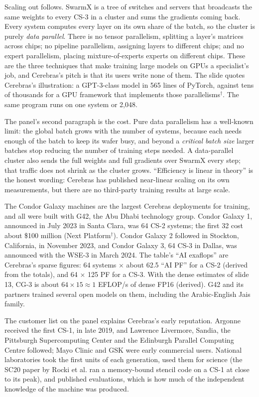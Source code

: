 \documentclass[11pt,letterpaper]{article}
\begin{document}
Scaling out follows. SwarmX is a tree of switches and servers that broadcasts the same weights to every CS-3 in a cluster and sums the gradients coming back. Every system computes every layer on its own share of the batch, so the cluster is purely \emph{data parallel}. There is no tensor parallelism, splitting a layer's matrices across chips; no pipeline parallelism, assigning layers to different chips; and no expert parallelism, placing mixture-of-experts experts on different chips. These are the three techniques that make training large models on GPUs a specialist's job, and Cerebras's pitch is that its users write none of them. The slide quotes Cerebras's illustration: a GPT-3-class model in 565 lines of PyTorch, against tens of thousands for a GPU framework that implements those parallelisms$^\dagger$. The same program runs on one system or 2{,}048.

The panel's second paragraph is the cost. Pure data parallelism has a well-known limit: the global batch grows with the number of systems, because each needs enough of the batch to keep its wafer busy, and beyond a \emph{critical batch size} larger batches stop reducing the number of training steps needed. A data-parallel cluster also sends the full weights and full gradients over SwarmX every step; that traffic does not shrink as the cluster grows. ``Efficiency is linear in theory'' is the honest wording: Cerebras has published near-linear scaling on its own measurements, but there are no third-party training results at large scale.

The Condor Galaxy machines are the largest Cerebras deployments for training, and all were built with G42, the Abu Dhabi technology group. Condor Galaxy 1, announced in July 2023 in Santa Clara, was 64 CS-2 systems; the first 32 cost about \$100 million (Next Platform$^\dagger$). Condor Galaxy 2 followed in Stockton, California, in November 2023, and Condor Galaxy 3, 64 CS-3 in Dallas, was announced with the WSE-3 in March 2024. The table's ``AI exaflops'' are Cerebras's sparse figures: 64 systems $\times$ about 62.5 ``AI PF'' for a CS-2 (derived from the totals), and 64 $\times$ 125 PF for a CS-3. With the dense estimates of slide 13, CG-3 is about $64 \times 15 \approx 1$ EFLOP/s of dense FP16 (derived). G42 and its partners trained several open models on them, including the Arabic-English Jais family.

The customer list on the panel explains Cerebras's early reputation. Argonne received the first CS-1, in late 2019, and Lawrence Livermore, Sandia, the Pittsburgh Supercomputing Center and the Edinburgh Parallel Computing Centre followed; Mayo Clinic and GSK were early commercial users. National laboratories took the first units of each generation, used them for science (the SC20 paper by Rocki et al. ran a memory-bound stencil code on a CS-1 at close to its peak), and published evaluations, which is how much of the independent knowledge of the machine was produced.
\end{document}
